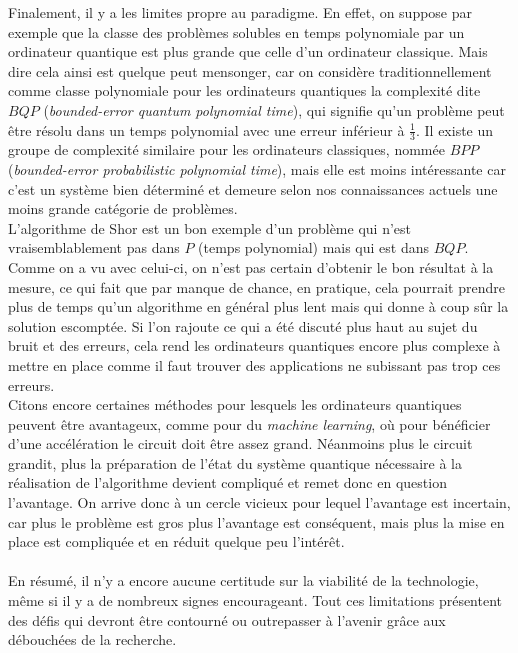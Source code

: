 \documentclass[11pt, a4paper]{report}
\begin{document}
Finalement, il y a les limites propre au paradigme. En effet, on suppose par exemple que la classe des problèmes solubles en temps polynomiale par un ordinateur quantique est plus grande que celle d'un ordinateur classique. Mais dire cela ainsi est quelque peut mensonger, car on considère traditionnellement comme classe polynomiale pour les ordinateurs quantiques la complexité dite $BQP$ (\textit{bounded-error quantum polynomial time}), qui signifie qu'un problème peut être résolu dans un temps polynomial avec une erreur inférieur à $\frac{1}{3}$. Il existe un groupe de complexité similaire pour les ordinateurs classiques, nommée $BPP$ (\textit{bounded-error probabilistic polynomial time}), mais elle est moins intéressante car c'est un système bien déterminé et demeure selon nos connaissances actuels une moins grande catégorie de problèmes.\\
L'algorithme de Shor est un bon exemple d'un problème qui n'est vraisemblablement pas dans $P$ (temps polynomial) mais qui est dans $BQP$. Comme on a vu avec celui-ci, on n'est pas certain d'obtenir le bon résultat à la mesure, ce qui fait que par manque de chance, en pratique, cela pourrait prendre plus de temps qu'un algorithme en général plus lent mais qui donne à coup sûr la solution escomptée. Si l'on rajoute ce qui a été discuté plus haut au sujet du bruit et des erreurs, cela rend les ordinateurs quantiques encore plus complexe à mettre en place comme il faut trouver des applications ne subissant pas trop ces erreurs.\\
Citons encore certaines méthodes pour lesquels les ordinateurs quantiques peuvent être avantageux, comme pour du \textit{machine learning}, où pour bénéficier d'une accélération le circuit doit être assez grand. Néanmoins plus le circuit grandit, plus la préparation de l'état du système quantique nécessaire à la réalisation de l'algorithme devient compliqué et remet donc en question l'avantage. On arrive donc à un cercle vicieux pour lequel l'avantage est incertain, car plus le problème est gros plus l'avantage est conséquent, mais plus la mise en place est compliquée et en réduit quelque peu l'intérêt.\\ \\
En résumé, il n'y a encore aucune certitude sur la viabilité de la technologie, même si il y a de nombreux signes encourageant. Tout ces limitations présentent des défis qui devront être contourné ou outrepasser à l'avenir grâce aux débouchées de la recherche.
\end{document}

